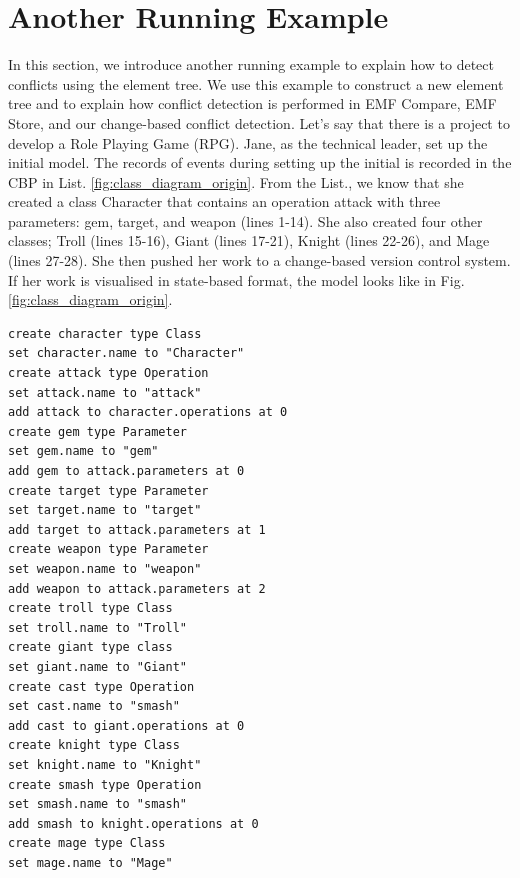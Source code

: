 \section{Another Running Example}
\label{sec:another_running_example}
In this section, we introduce another running example to explain how to detect conflicts using the element tree. We use this example to construct a new element tree and to explain how conflict detection is performed in EMF Compare, EMF Store, and our change-based conflict detection. Let's say that there is a project to develop a Role Playing Game (RPG). Jane, as the technical leader, set up the initial model. The records of events during setting up the initial is recorded in the CBP in List. \ref{fig:class_diagram_origin}. From the List., we know that she created a class \textsf{Character} that contains an operation \textsf{attack} with three parameters: \textsf{gem}, \textsf{target}, and \textsf{weapon} (lines 1-14). She also created four other classes; \textsf{Troll} (lines 15-16), \textsf{Giant} (lines 17-21), \textsf{Knight} (lines 22-26), and \textsf{Mage} (lines 27-28). She then pushed her work to a change-based version control system. If her work is visualised in state-based format, the model looks like in Fig. \ref{fig:class_diagram_origin}.

\vspace{-15pt}
\begin{lstlisting}[firstnumber=1,style=eol,caption={The recorded events to produce the original model in Fig. \ref{fig:class_diagram_origin} (original version).},label=lst:cbp_origin]
create character type Class
set character.name to "Character" 
create attack type Operation
set attack.name to "attack" 
add attack to character.operations at 0
create gem type Parameter
set gem.name to "gem" 
add gem to attack.parameters at 0
create target type Parameter
set target.name to "target" 
add target to attack.parameters at 1
create weapon type Parameter
set weapon.name to "weapon" 
add weapon to attack.parameters at 2
create troll type Class
set troll.name to "Troll" 
create giant type class
set giant.name to "Giant"
create cast type Operation
set cast.name to "smash"
add cast to giant.operations at 0
create knight type Class
set knight.name to "Knight"
create smash type Operation
set smash.name to "smash"
add smash to knight.operations at 0
create mage type Class
set mage.name to "Mage" 
\end{lstlisting}

